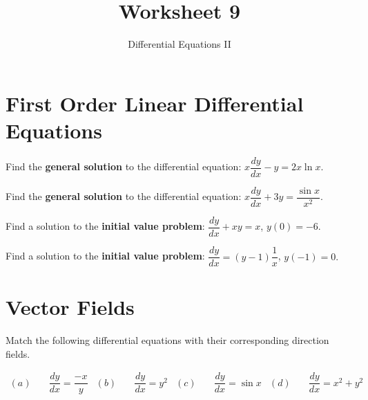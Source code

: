 \documentclass{article}
\title{Worksheet 9}
\subtitle{Differential Equations II}
\begin{document}
\maketitle

\section*{First Order Linear Differential Equations}

\Prob Find the \textbf{general solution} to the differential equation: $x\dfrac{dy}{dx} - y = 2x \ln x$.\vfill

\Prob Find the \textbf{general solution} to the differential equation: $x\dfrac{dy}{dx} + 3y = \dfrac{\sin x}{x^2}$.\vfill

\newpage

\Prob Find a solution to the \textbf{initial value problem}: \qquad $\dfrac{dy}{dx} + xy = x$, \qquad $y(0) = -6.$\vfill

\Prob Find a solution to the \textbf{initial value problem}: \qquad $\dfrac{dy}{dx} = (y - 1)\dfrac{1}{x}$, \qquad $y(-1) = 0.$\vfill

\newpage

\section*{Vector Fields}

\Prob Match the following differential equations with their corresponding direction fields.\vspace{0.5cm}

\begin{align*}
	(a) \quad &\dfrac{dy}{dx} = \dfrac{-x}{y}&
	(b) \quad &\dfrac{dy}{dx} = y^2&
	(c) \quad &\dfrac{dy}{dx} = \sin x& 
	(d) \quad &\dfrac{dy}{dx} = x^2 + y^2
\end{align*}

\begin{figure}[h]
	\begin{minipage}{0.5\textwidth}
		\centering
		\def\svgwidth{\columnwidth}
		
	\end{minipage}
	\begin{minipage}{0.5\textwidth}
		\centering
		\def\svgwidth{\columnwidth}
		
	\end{minipage}
\end{figure}%

\begin{figure}[h]
	\begin{minipage}{0.5\textwidth}
		\centering
		\def\svgwidth{\columnwidth}
		
	\end{minipage}
	\begin{minipage}{0.5\textwidth}
		\centering
		\def\svgwidth{\columnwidth}
		
	\end{minipage}
\end{figure}%
\end{document}
